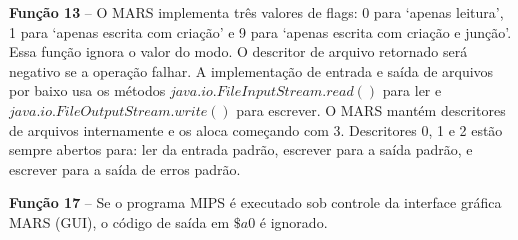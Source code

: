 \textbf{Função 13} – O MARS implementa três valores de flags: 0 para `apenas leitura', 1 para `apenas escrita com criação' e 9 para `apenas escrita com criação e junção'. Essa função ignora o valor do modo. O descritor de arquivo retornado será negativo se a operação falhar. A implementação de entrada e saída de arquivos por baixo usa os métodos $java.io.FileInputStream.read()$ para ler e $java.io.FileOutputStream.write()$ para escrever. O MARS mantém descritores de arquivos internamente e os aloca começando com 3. Descritores 0, 1 e 2 estão sempre abertos para: ler da entrada padrão, escrever para a saída padrão, e escrever para a saída de erros padrão.

\textbf{Função 17} – Se o programa MIPS é executado sob controle da interface gráfica MARS (GUI), o código de saída em $\$a0$ é ignorado.
